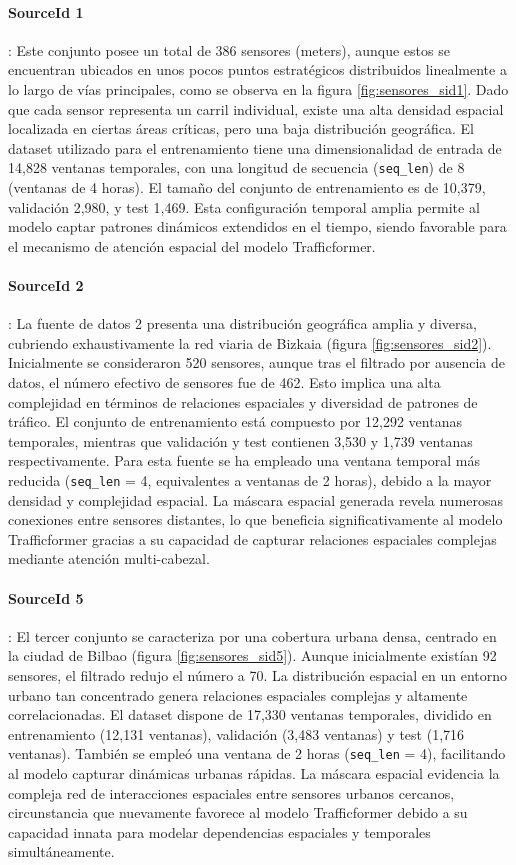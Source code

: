 \paragraph{SourceId 1}: Este conjunto posee un total de 386 sensores (meters), aunque estos se encuentran ubicados en unos pocos puntos estratégicos distribuidos linealmente a lo largo de vías principales, como se observa en la figura \ref{fig:sensores_sid1}. Dado que cada sensor representa un carril individual, existe una alta densidad espacial localizada en ciertas áreas críticas, pero una baja distribución geográfica. El dataset utilizado para el entrenamiento tiene una dimensionalidad de entrada de 14,828 ventanas temporales, con una longitud de secuencia (\texttt{seq_len}) de 8 (ventanas de 4 horas). El tamaño del conjunto de entrenamiento es de 10,379, validación 2,980, y test 1,469. Esta configuración temporal amplia permite al modelo captar patrones dinámicos extendidos en el tiempo, siendo favorable para el mecanismo de atención espacial del modelo Trafficformer.

\paragraph{SourceId 2}: La fuente de datos 2 presenta una distribución geográfica amplia y diversa, cubriendo exhaustivamente la red viaria de Bizkaia (figura \ref{fig:sensores_sid2}). Inicialmente se consideraron 520 sensores, aunque tras el filtrado por ausencia de datos, el número efectivo de sensores fue de 462. Esto implica una alta complejidad en términos de relaciones espaciales y diversidad de patrones de tráfico. El conjunto de entrenamiento está compuesto por 12,292 ventanas temporales, mientras que validación y test contienen 3,530 y 1,739 ventanas respectivamente. Para esta fuente se ha empleado una ventana temporal más reducida (\texttt{seq_len} = 4, equivalentes a ventanas de 2 horas), debido a la mayor densidad y complejidad espacial. La máscara espacial generada revela numerosas conexiones entre sensores distantes, lo que beneficia significativamente al modelo Trafficformer gracias a su capacidad de capturar relaciones espaciales complejas mediante atención multi-cabezal.

\paragraph{SourceId 5}: El tercer conjunto se caracteriza por una cobertura urbana densa, centrado en la ciudad de Bilbao (figura \ref{fig:sensores_sid5}). Aunque inicialmente existían 92 sensores, el filtrado redujo el número a 70. La distribución espacial en un entorno urbano tan concentrado genera relaciones espaciales complejas y altamente correlacionadas. El dataset dispone de 17,330 ventanas temporales, dividido en entrenamiento (12,131 ventanas), validación (3,483 ventanas) y test (1,716 ventanas). También se empleó una ventana de 2 horas (\texttt{seq_len} = 4), facilitando al modelo capturar dinámicas urbanas rápidas. La máscara espacial evidencia la compleja red de interacciones espaciales entre sensores urbanos cercanos, circunstancia que nuevamente favorece al modelo Trafficformer debido a su capacidad innata para modelar dependencias espaciales y temporales simultáneamente.

